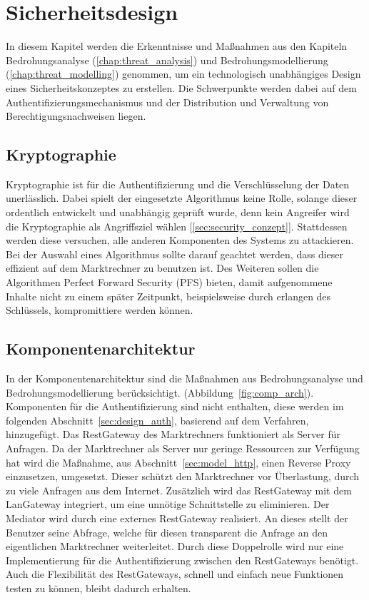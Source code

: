 \documentclass[11pt,a4paper]{report}
\begin{document}
\chapter{Sicherheitsdesign} \label{chap:design}

In diesem Kapitel werden die Erkenntnisse und Maßnahmen aus den Kapiteln Bedrohungsanalyse (\ref{chap:threat_analysis}) und Bedrohungsmodellierung (\ref{chap:threat_modelling}) genommen, um ein technologisch unabhängiges Design eines Sicherheitskonzeptes zu erstellen. Die Schwerpunkte werden dabei auf dem Authentifizierungsmechanismus und der Distribution und Verwaltung von Berechtigungsnachweisen liegen.

\section{Kryptographie} \label{sec:design_crypto}

Kryptographie ist für die Authentifizierung und die Verschlüsselung der Daten unerlässlich. Dabei spielt der eingesetzte Algorithmus keine Rolle, solange dieser ordentlich entwickelt und unabhängig geprüft wurde, denn kein Angreifer wird die Kryptographie als Angriffsziel wählen [\ref{sec:security_conzept}]. Stattdessen werden diese versuchen, alle anderen Komponenten des Systems zu attackieren. Bei der Auswahl eines Algorithmus sollte darauf geachtet werden, dass dieser effizient auf dem Marktrechner zu benutzen ist. Des Weiteren sollen die Algorithmen Perfect Forward Security (PFS) bieten, damit aufgenommene Inhalte nicht zu einem später Zeitpunkt, beispielsweise durch erlangen des Schlüssels, kompromittiere werden können. 

\section{Komponentenarchitektur}

In der Komponentenarchitektur sind die Maßnahmen aus Bedrohungsanalyse und Bedrohungsmodellierung berücksichtigt. (Abbildung~\ref{fig:comp_arch}). Komponenten für die Authentifizierung sind nicht enthalten, diese werden im folgenden Abschnitt~\ref{sec:design_auth}, basierend auf dem Verfahren, hinzugefügt. Das RestGateway des Marktrechners funktioniert als Server für Anfragen. Da der Marktrechner als Server nur geringe Ressourcen zur Verfügung hat wird die Maßnahme, aus Abschnitt~\ref{sec:model_http}, einen Reverse Proxy einzusetzen, umgesetzt. Dieser schützt den Marktrechner vor Überlastung, durch zu viele Anfragen aus dem Internet. Zusätzlich wird das RestGateway mit dem LanGateway integriert, um eine unnötige Schnittstelle zu eliminieren. Der Mediator wird durch eine externes RestGateway realisiert. An dieses stellt der Benutzer seine Abfrage, welche für diesen transparent die Anfrage an den eigentlichen Marktrechner weiterleitet. Durch diese Doppelrolle wird nur eine Implementierung für die Authentifizierung zwischen den RestGateways benötigt. Auch die Flexibilität des RestGateways, schnell und einfach neue Funktionen testen zu können, bleibt dadurch erhalten. 
\end{document}
